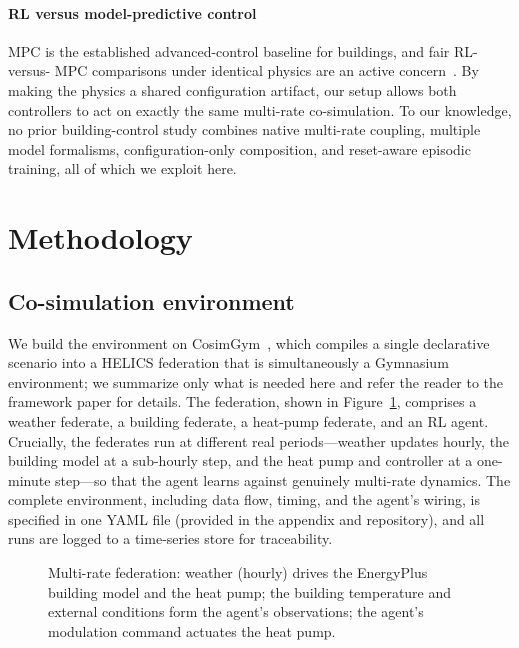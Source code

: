 \documentclass[preprint,review,12pt]{elsarticle}
\begin{document}
\paragraph{RL versus model-predictive control}
MPC is the established advanced-control baseline for buildings, and fair RL-versus-
MPC comparisons under identical physics are an active concern~\cite{boptest}. By
making the physics a shared configuration artifact, our setup allows both
controllers to act on exactly the same multi-rate co-simulation. To our knowledge,
no prior building-control study combines native multi-rate coupling, multiple model
formalisms, configuration-only composition, and reset-aware episodic training, all
of which we exploit here.

\section{Methodology}\label{sec:method}
\subsection{Co-simulation environment}
We build the environment on CosimGym~\cite{cosimgym_paperA}, which compiles a
single declarative scenario into a HELICS federation that is simultaneously a
Gymnasium environment; we summarize only what is needed here and refer the reader
to the framework paper for details. The federation, shown in
Figure~\ref{fig:federation}, comprises a weather federate, a building federate, a
heat-pump federate, and an RL agent. Crucially, the federates run at different real
periods---weather updates hourly, the building model at a sub-hourly step, and the
heat pump and controller at a one-minute step---so that the agent learns against
genuinely multi-rate dynamics. The complete environment, including data flow,
timing, and the agent's wiring, is specified in one YAML file (provided in the
appendix and repository), and all runs are logged to a time-series store for
traceability.

\begin{figure}[t]\centering
\caption{Multi-rate federation: weather (hourly) drives the EnergyPlus building
model and the heat pump; the building temperature and external conditions form the
agent's observations; the agent's modulation command actuates the heat pump.}
\label{fig:federation}
\end{figure}
\end{document}
